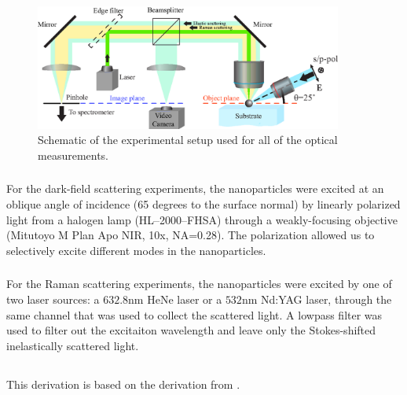             \begin{figure}[!ht]
                    \begin{center}
                        \includegraphics[width=0.9\textwidth]{figs/methods/expSetup2.eps}
                    \end{center}
                    \caption{Schematic of the experimental setup used for all of the optical measurements.}
                    \label{fig:expSetup}
            \end{figure}


        \subsubsection{}
            \label{sec:Darkfield}
                For the dark-field scattering experiments, the nanoparticles were excited at an oblique angle of incidence
            (65 degrees to the surface normal) by linearly polarized light from a halogen lamp (HL--2000--FHSA)
            through a weakly-focusing objective (Mitutoyo M Plan Apo NIR, 10x, NA=0.28). The polarization allowed us to
            selectively excite different modes in the nanoparticles\cite{permyakov2015probing}.

        \subsubsection{}
        \label{sec:Raman}
                For the Raman scattering experiments, the nanoparticles were excited by one of two laser sources: a $632.8$nm HeNe laser
            or a $532$nm Nd:YAG laser, through the same channel that was used to collect the scattered light. A lowpass filter was used
            to filter out the excitaiton wavelength and leave only the Stokes-shifted inelastically scattered light.

    \subsection{}
        \label{sec:Theory}
            This derivation is based on the derivation from \cite{dmitriev2016resonant}.

